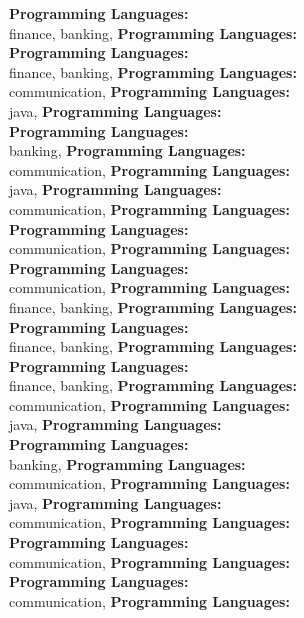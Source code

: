 \textbf{Programming Languages:} \\
finance, banking, \textbf{Programming Languages:} \\
\textbf{Programming Languages:} \\
finance, banking, \textbf{Programming Languages:} \\
communication, \textbf{Programming Languages:} \\
java, \textbf{Programming Languages:} \\
\textbf{Programming Languages:} \\
banking, \textbf{Programming Languages:} \\
communication, \textbf{Programming Languages:} \\
java, \textbf{Programming Languages:} \\
communication, \textbf{Programming Languages:} \\
\textbf{Programming Languages:} \\
communication, \textbf{Programming Languages:} \\
\textbf{Programming Languages:} \\
communication, \textbf{Programming Languages:} \\
finance, banking, \textbf{Programming Languages:} \\
\textbf{Programming Languages:} \\
finance, banking, \textbf{Programming Languages:} \\
\textbf{Programming Languages:} \\
finance, banking, \textbf{Programming Languages:} \\
communication, \textbf{Programming Languages:} \\
java, \textbf{Programming Languages:} \\
\textbf{Programming Languages:} \\
banking, \textbf{Programming Languages:} \\
communication, \textbf{Programming Languages:} \\
java, \textbf{Programming Languages:} \\
communication, \textbf{Programming Languages:} \\
\textbf{Programming Languages:} \\
communication, \textbf{Programming Languages:} \\
\textbf{Programming Languages:} \\
communication, \textbf{Programming Languages:} \\
